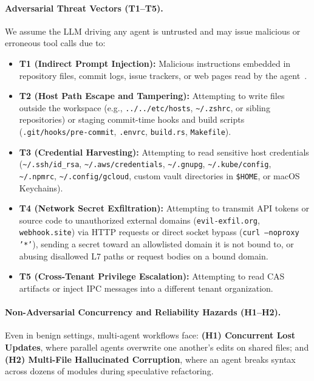 \documentclass[10pt,twocolumn]{article}
\begin{document}
\paragraph{Adversarial Threat Vectors (T1--T5).} We assume the LLM driving any agent is untrusted and may issue malicious or erroneous tool calls due to:
\begin{itemize}
    \item \textbf{T1 (Indirect Prompt Injection):} Malicious instructions embedded in repository files, commit logs, issue trackers, or web pages read by the agent~\cite{greshake2023not,debenedetti2024agentdojo}.
    \item \textbf{T2 (Host Path Escape and Tampering):} Attempting to write files outside the workspace (e.g., \texttt{../../etc/hosts}, \texttt{\textasciitilde/.zshrc}, or sibling repositories) or staging commit-time hooks and build scripts (\texttt{.git/hooks/pre-commit}, \texttt{.envrc}, \texttt{build.rs}, \texttt{Makefile}).
    \item \textbf{T3 (Credential Harvesting):} Attempting to read sensitive host credentials (\texttt{\textasciitilde/.ssh/id\_rsa}, \texttt{\textasciitilde/.aws/credentials}, \texttt{\textasciitilde/.gnupg}, \texttt{\textasciitilde/.kube/config}, \texttt{\textasciitilde/.npmrc}, \texttt{\textasciitilde/.config/gcloud}, custom vault directories in \texttt{\$HOME}, or macOS Keychains).
    \item \textbf{T4 (Network Secret Exfiltration):} Attempting to transmit API tokens or source code to unauthorized external domains (\texttt{evil-exfil.org}, \texttt{webhook.site}) via HTTP requests or direct socket bypass (\texttt{curl --noproxy '*'}), sending a secret toward an allowlisted domain it is not bound to, or abusing disallowed L7 paths or request bodies on a bound domain.
    \item \textbf{T5 (Cross-Tenant Privilege Escalation):} Attempting to read CAS artifacts or inject IPC messages into a different tenant organization.
\end{itemize}

\paragraph{Non-Adversarial Concurrency and Reliability Hazards (H1--H2).} Even in benign settings, multi-agent workflows face: \textbf{(H1) Concurrent Lost Updates}, where parallel agents overwrite one another's edits on shared files; and \textbf{(H2) Multi-File Hallucinated Corruption}, where an agent breaks syntax across dozens of modules during speculative refactoring.
\end{document}
